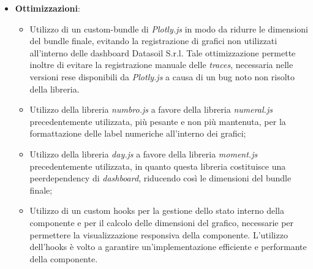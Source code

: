 \begin{itemize}
\begin{listing}[H]
\begin{verbatim}
                  \end{verbatim}
                  \caption{Definizione delle props della componente Chart}
                  \label{listing:chartProps}
            \end{listing}
      \item \textbf{Ottimizzazioni}:
            \begin{itemize}
                  \item Utilizzo di un custom-bundle di \textit{Plotly.js} in modo da ridurre le dimensioni del bundle finale, evitando la registrazione
                        di grafici non utilizzati all'interno delle dashboard Datasoil S.r.l. Tale ottimizzazione permette inoltre di evitare la registrazione
                        manuale delle \textit{traces}, necessaria nelle versioni rese disponibili da \textit{Plotly.js} a causa di un bug noto non risolto della libreria.
                  \item Utilizzo della libreria \textit{numbro.js} a favore della libreria \textit{numeral.js} precedentemente utilizzata, più pesante e non più mantenuta,
                        per la formattazione delle label numeriche all'interno dei grafici;
                  \item Utilizzo della libreria \textit{day.js} a favore della libreria \textit{moment.js} precedentemente utilizzata, in quanto questa libreria costituisce una
                        peerdependency di \textit{dashboard}, riducendo così le dimensioni del bundle finale;
                  \item Utilizzo di un custom hooks per la gestione dello stato interno della componente e per il calcolo delle dimensioni del grafico, necessarie per permettere
                        la visualizzazione responsiva della componente. L'utilizzo dell'hooks è volto a garantire un'implementazione efficiente e performante della componente.
            \end{itemize}
\end{itemize}

